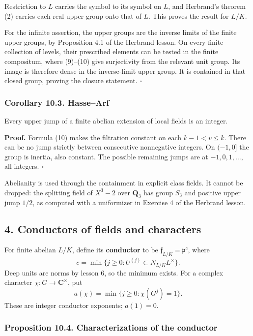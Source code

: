\documentclass[11pt,a4paper]{article}
\begin{document}
Restriction to \(L\) carries the symbol to its symbol on \(L\), and
Herbrand's theorem (2) carries each real upper group onto that of \(L\).
This proves the result for \(L/K\).

For the infinite assertion, the upper groups are the inverse limits of
the finite upper groups, by Proposition 4.1 of the Herbrand lesson. On
every finite collection of levels, their prescribed elements can be
tested in the finite compositum, where (9)--(10) give surjectivity from
the relevant unit group. Its image is therefore dense in the
inverse-limit upper group. It is contained in that closed group, proving
the closure statement. \(\square\)

\subsubsection{Corollary 10.3.
Hasse--Arf}\label{corollary-10.3.-hassearf}

Every upper jump of a finite abelian extension of local fields is an
integer.

\textbf{Proof.} Formula (10) makes the filtration constant on each
\(k-1<v\leq k\). There can be no jump strictly between consecutive
nonnegative integers. On \((-1,0]\) the group is inertia, also constant.
The possible remaining jumps are at \(-1,0,1,\ldots\), all integers.
\(\square\)

Abelianity is used through the containment in explicit class fields. It
cannot be dropped: the splitting field of \(X^3-2\) over \(\mathbf Q_3\)
has group \(S_3\) and positive upper jump \(1/2\), as computed with a
uniformizer in Exercise 4 of the Herbrand lesson.

\subsection{4. Conductors of fields and
characters}\label{conductors-of-fields-and-characters}

For finite abelian \(L/K\), define its \textbf{conductor} to be
\(\mathfrak f_{L/K}=\mathfrak p^c\), where \[
c=\min\{j\geq0:U^{(j)}\subset N_{L/K}L^\times\}.
\tag{11}
\] Deep units are norms by lesson 6, so the minimum exists. For a
complex character \(\chi:G\to\mathbf C^\times\), put \[
a(\chi)=\min\{j\geq0:\chi(G^j)=1\}.
\tag{12}
\] These are integer conductor exponents; \(a(1)=0\).

\subsubsection{Proposition 10.4. Characterizations of the
conductor}\label{proposition-10.4.-characterizations-of-the-conductor}
\end{document}
